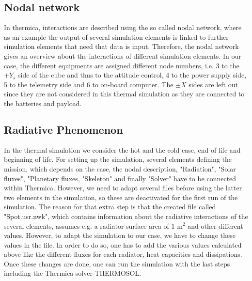\subsection{Nodal network}
In thermica, interactions are described using the so called nodal network, where as an example the output of several simulation elements is linked to further simulation elements that need that data is input. Therefore, the nodal network gives an overview about the interactions of different simulation elements. In our case, the different equipments are assigned different node numbers, i.e. 3 to the $+Y_{s}$ side of the cube and thus to the attitude control, 4 to the power supply side,  5 to the telemetry side and 6 to on-board computer. The $\pm X$ sides are left out since they are not considered in this thermal simulation as they are connected to the batteries and payload.

\subsection{Radiative Phenomenon}
In the thermal simulation we consider the hot and the cold case, end of life and beginning of life. For setting up the simulation, several elements defining the mission, which depends on the case, the nodal description, "Radiation", "Solar fluxes", "Planetary fluxes, "Skeleton" and finally "Solver" have to be connected within Thermica. However, we need to adapt several files before using the latter two elements in the simulation, so these are deactivated for the first run of the simulation.  
The reason for that extra step is that the created file called "Spot.usr.nwk", which contains information about the radiative interactions of the several elements, assumes e.g. a radiator surface area of $1$ m$^{2}$ and other different values. However, to adapt the simulation to our case, we have to change these values in the file. In order to do so, one has to add the various values calculated above like the different fluxes for each radiator, heat capacities and dissipations. Once these changes are done, one can run the simulation with the last steps including the Thermica solver THERMOSOL.

